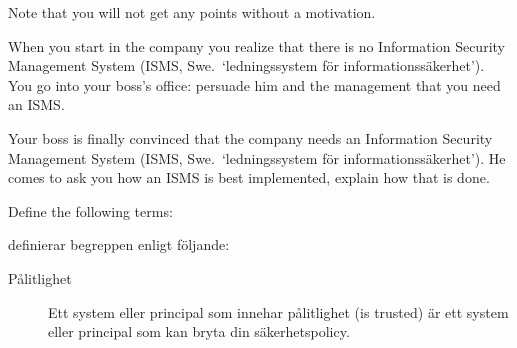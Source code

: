 \documentclass[svv,addpoints]{miunexam}
\begin{document}
\begin{questions}
  Note that you will not get any points without a motivation.


  \question[5]\label{q:msb:E:C}
  When you start in the company you realize that there is no Information 
  Security Management System (ISMS, Swe.~`ledningssystem för 
  informationssäkerhet').
  You go into your boss's office: persuade him and the management that you need 
  an ISMS.


  \question[5]\label{q:msb:E:C}
  Your boss is finally convinced that the company needs an Information Security 
  Management System (ISMS, Swe.~`ledningssystem för informationssäkerhet').
  He comes to ask you how an ISMS is best implemented, explain how that is 
  done.


  \question\label{q:foundations:E}
  Define the following terms:

  \begin{solution}
    \citet[ss.\ 13--14]{Anderson2008sea} definierar begreppen enligt följande:
    \begin{description}
      \item[Pålitlighet] Ett system eller principal som innehar pålitlighet 
        (\foreignlanguage{english}{is trusted}) är ett system eller principal 
        som kan bryta din säkerhetspolicy.


\end{description}
\end{solution}
\end{questions}
\end{document}
